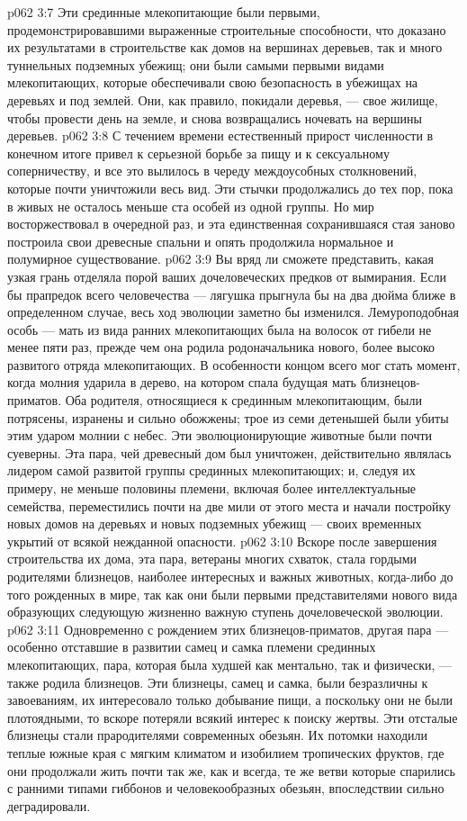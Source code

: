 \vs p062 3:7 Эти срединные млекопитающие были первыми, продемонстрировавшими выраженные строительные способности, что доказано их результатами в строительстве как домов на вершинах деревьев, так и много туннельных подземных убежищ; они были самыми первыми видами млекопитающих, которые обеспечивали свою безопасность в убежищах на деревьях и под землей. Они, как правило, покидали деревья, --- свое жилище, чтобы провести день на земле, и снова возвращались ночевать на вершины деревьев.
\vs p062 3:8 С течением времени естественный прирост численности в конечном итоге привел к серьезной борьбе за пищу и к сексуальному соперничеству, и все это вылилось в череду междоусобных столкновений, которые почти уничтожили весь вид. Эти стычки продолжались до тех пор, пока в живых не осталось меньше ста особей из одной группы. Но мир восторжествовал в очередной раз, и эта единственная сохранившаяся стая заново построила свои древесные спальни и опять продолжила нормальное и полумирное существование.
\vs p062 3:9 \pc Вы вряд ли сможете представить, какая узкая грань отделяла порой ваших дочеловеческих предков от вымирания. Если бы прапредок всего человечества --- лягушка прыгнула бы на два дюйма ближе в определенном случае, весь ход эволюции заметно бы изменился. Лемуроподобная особь --- мать из вида ранних млекопитающих была на волосок от гибели не менее пяти раз, прежде чем она родила родоначальника нового, более высоко развитого отряда млекопитающих. В особенности концом всего мог стать момент, когда молния ударила в дерево, на котором спала будущая мать близнецов\hyp{}приматов. Оба родителя, относящиеся к срединным млекопитающим, были потрясены, изранены и сильно обожжены; трое из семи детенышей были убиты этим ударом молнии с небес. Эти эволюционирующие животные были почти суеверны. Эта пара, чей древесный дом был уничтожен, действительно являлась лидером самой развитой группы срединных млекопитающих; и, следуя их примеру, не меньше половины племени, включая более интеллектуальные семейства, переместились почти на две мили от этого места и начали постройку новых домов на деревьях и новых подземных убежищ --- своих временных укрытий от всякой нежданной опасности.
\vs p062 3:10 Вскоре после завершения строительства их дома, эта пара, ветераны многих схваток, стала гордыми родителями близнецов, наиболее интересных и важных животных, когда\hyp{}либо до того рожденных в мире, так как они были первыми представителями нового вида  образующих следующую жизненно важную ступень дочеловеческой эволюции.
\vs p062 3:11 \pc Одновременно с рождением этих близнецов\hyp{}приматов, другая пара --- особенно отставшие в развитии самец и самка племени срединных млекопитающих, пара, которая была худшей как ментально, так и физически, --- также родила близнецов. Эти близнецы, самец и самка, были безразличны к завоеваниям, их интересовало только добывание пищи, а поскольку они не были плотоядными, то вскоре потеряли всякий интерес к поиску жертвы. Эти отсталые близнецы стали прародителями современных обезьян. Их потомки находили теплые южные края с мягким климатом и изобилием тропических фруктов, где они продолжали жить почти так же, как и всегда, те же ветви которые спарились с ранними типами гиббонов и человекообразных обезьян, впоследствии сильно деградировали.
